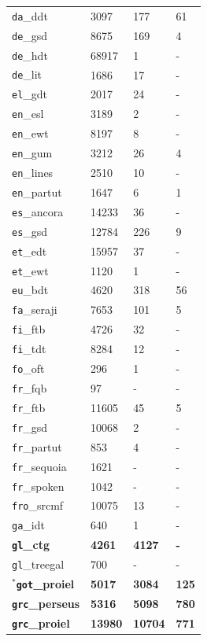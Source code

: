 \begin{table}[H]
{\begin{tabular}{|l|l|l|l|}
\texttt{da}\_ddt & 3097 & 177 & 61\\
\texttt{de}\_gsd & 8675 & 169 & 4\\
\texttt{de}\_hdt & 68917 & 1 & -\\
\texttt{de}\_lit & 1686 & 17 & -\\
\texttt{el}\_gdt & 2017 & 24 & -\\
\texttt{en}\_esl & 3189 & 2 & -\\
\texttt{en}\_ewt & 8197 & 8 & -\\
\texttt{en}\_gum & 3212 & 26 & 4\\
\texttt{en}\_lines & 2510 & 10 & -\\
\texttt{en}\_partut & 1647 & 6 & 1\\
\texttt{es}\_ancora & 14233 & 36 & -\\
\texttt{es}\_gsd & 12784 & 226 & 9\\
\texttt{et}\_edt & 15957 & 37 & -\\
\texttt{et}\_ewt & 1120 & 1 & -\\
\texttt{eu}\_bdt & 4620 & 318 & 56\\
\texttt{fa}\_seraji & 7653 & 101 & 5\\
\texttt{fi}\_ftb & 4726 & 32 & -\\
\texttt{fi}\_tdt & 8284 & 12 & -\\
\texttt{fo}\_oft & 296 & 1 & -\\
\texttt{fr}\_fqb & 97 & - & -\\
\texttt{fr}\_ftb & 11605 & 45 & 5\\
\texttt{fr}\_gsd & 10068 & 2 & -\\
\texttt{fr}\_partut & 853 & 4 & -\\
\texttt{fr}\_sequoia & 1621 & - & - \\
\texttt{fr}\_spoken & 1042 & - & -\\
\texttt{fro}\_srcmf & 10075 & 13 & -\\
\texttt{ga}\_idt & 640 & 1 & -\\
\textbf{\texttt{gl}\_ctg} & \textbf{4261} & \textbf{4127} & \textbf{-}\\
\texttt{gl}\_treegal & 700 & - & -\\
\(^{*}\)\textbf{\texttt{got}\_proiel} & \textbf{5017} & \textbf{3084} & \textbf{125}\\
\textbf{\texttt{grc}\_perseus} & \textbf{5316} & \textbf{5098} & \textbf{780}\\
\textbf{\texttt{grc}\_proiel} & \textbf{13980} & \textbf{10704} & \textbf{771}\\

\end{tabular}}
\end{table}
